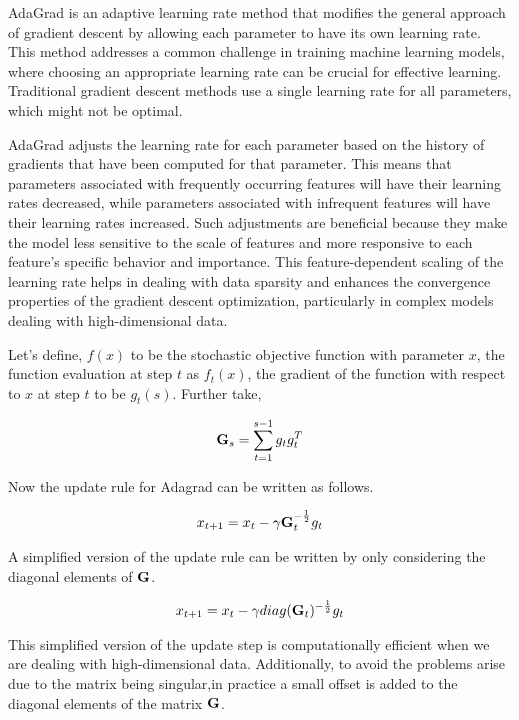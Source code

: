 AdaGrad is an adaptive learning rate method that modifies the general approach of gradient descent by allowing each parameter to have its own learning rate. This method addresses a common challenge in training machine learning models, where choosing an appropriate learning rate can be crucial for effective learning. Traditional gradient descent methods use a single learning rate for all parameters, which might not be optimal.

AdaGrad adjusts the learning rate for each parameter based on the history of gradients that have been computed for that parameter. This means that parameters associated with frequently occurring features will have their learning rates decreased, while parameters associated with infrequent features will have their learning rates increased. Such adjustments are beneficial because they make the model less sensitive to the scale of features and more responsive to each feature's specific behavior and importance. This feature-dependent scaling of the learning rate helps in dealing with data sparsity and enhances the convergence properties of the gradient descent optimization, particularly in complex models dealing with high-dimensional data. 

Let's define, $f(x)$ to be the stochastic objective function with parameter $x$, the function evaluation at step $t$ as $f_{t}(x)$, the gradient of the function with respect to $x$ at step $t$ to be $g_{t}(s)$. Further take,

\begin{align}
    \mathbf{G}_s = \sum_{t = 1}^{s-1} g_t g_t^T
\end{align}

Now the update rule for Adagrad can be written as follows.

\begin{align}
    x_{t+1} = x_{t} - \gamma \mathbf{G}_t^{-\frac{1}{2}} g_t
\end{align}

A simplified version of the update rule can be written by only considering the diagonal elements of $\mathbf{G}$.


\begin{align}
    x_{t+1} = x_{t} - \gamma diag(\mathbf{G}_t)^{-\frac{1}{2}} g_t
\end{align}

This simplified version of the update step is computationally efficient when we are dealing with high-dimensional data. Additionally, to avoid the problems arise due to the matrix being singular,in practice a small offset is added to the diagonal elements of the matrix $\mathbf{G}$.  

